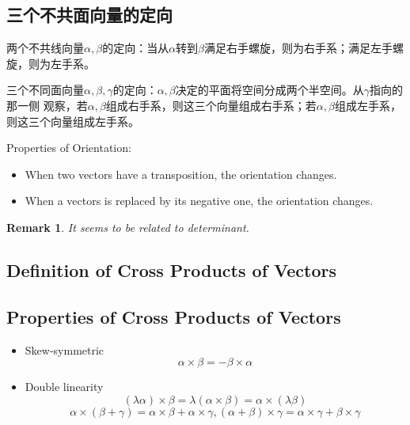\documentclass[onecolumn]{ctexart}
\newtheorem{remark}{Remark}
\begin{document}
\subsection{三个不共面向量的定向}

两个不共线向量$\alpha, \beta$的定向：当从$\alpha$转到$\beta$满足右手螺旋，则为右手系；满足左手螺旋，则为左手系。

三个不同面向量$\alpha, \beta, \gamma$的定向：$\alpha, \beta$决定的平面将空间分成两个半空间。从$\gamma$指向的那一侧
观察，若$\alpha, \beta$组成右手系，则这三个向量组成右手系；若$\alpha, \beta$组成左手系，则这三个向量组成左手系。

Properties of Orientation:
\begin{itemize}
  \item When two vectors have a transposition, the orientation changes.
  \item When a vectors is replaced by its negative one, the orientation changes.
\end{itemize}

\begin{remark}
  It seems to be related to determinant.
\end{remark}

\subsection{Definition of Cross Products of Vectors}

\subsection{Properties of Cross Products of Vectors}

\begin{itemize}
  \item Skew-symmetric
  \begin{equation}
    \alpha \times \beta = - \beta \times \alpha
  \end{equation}
  \item Double linearity
  \begin{equation}
    (\lambda \alpha) \times \beta = \lambda (\alpha \times \beta) = \alpha \times (\lambda \beta)
  \end{equation}
  \begin{equation}
    \alpha \times (\beta + \gamma) = \alpha \times \beta + \alpha \times \gamma, (\alpha + \beta) \times \gamma = \alpha \times \gamma + \beta \times \gamma
  \end{equation}
\end{itemize}
\end{document}
